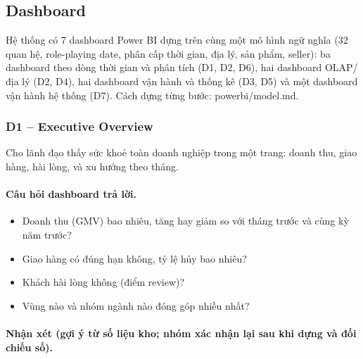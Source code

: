 \subsection{Dashboard}

Hệ thống có 7 dashboard Power BI dựng trên cùng một mô hình ngữ nghĩa (32 quan hệ, role-playing date, phân cấp thời gian, địa lý, sản phẩm, seller): ba dashboard theo dòng thời gian và phân tích (D1, D2, D6), hai dashboard OLAP/địa lý (D2, D4), hai dashboard vận hành và thống kê (D3, D5) và một dashboard vận hành hệ thống (D7). Cách dựng từng bước: powerbi/model.md.


\subsubsection*{D1 – Executive Overview}

Cho lãnh đạo thấy sức khoẻ toàn doanh nghiệp trong một trang: doanh thu, giao hàng, hài lòng, và xu hướng theo tháng.

\paragraph{Câu hỏi dashboard trả lời.}

\begin{itemize}
  \item Doanh thu (GMV) bao nhiêu, tăng hay giảm so với tháng trước và cùng kỳ năm trước?
  \item Giao hàng có đúng hạn không, tỷ lệ hủy bao nhiêu?
  \item Khách hài lòng không (điểm review)?
  \item Vùng nào và nhóm ngành nào đóng góp nhiều nhất?
\end{itemize}



\paragraph{Nhận xét (gợi ý từ số liệu kho; \textbf{nhóm xác nhận lại sau khi dựng và đối chiếu số}).}

